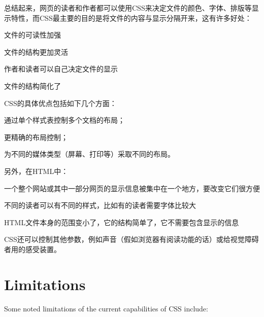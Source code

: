 总结起来，网页的读者和作者都可以使用CSS来决定文件的颜色、字体、排版等显示特性，而CSS最主要的目的是将文件的内容与显示分隔开来，这有许多好处：

\begin{compactitem}
\item 文件的可读性加强
\item 文件的结构更加灵活
\item 作者和读者可以自己决定文件的显示
\item 文件的结构简化了
\end{compactitem}

CSS的具体优点包括如下几个方面：

\begin{compactitem}
\item 通过单个样式表控制多个文档的布局；
\item 更精确的布局控制；
\item 为不同的媒体类型（屏幕、打印等）采取不同的布局。
\end{compactitem}

另外，在HTML中：

\begin{compactitem}
\item 一个整个网站或其中一部分网页的显示信息被集中在一个地方，要改变它们很方便
\item 不同的读者可以有不同的样式，比如有的读者需要字体比较大
\item HTML文件本身的范围变小了，它的结构简单了，它不需要包含显示的信息
\end{compactitem}

CSS还可以控制其他参数，例如声音（假如浏览器有阅读功能的话）或给视觉障碍者用的感受装置。



\section{Limitations}


Some noted limitations of the current capabilities of CSS include:

